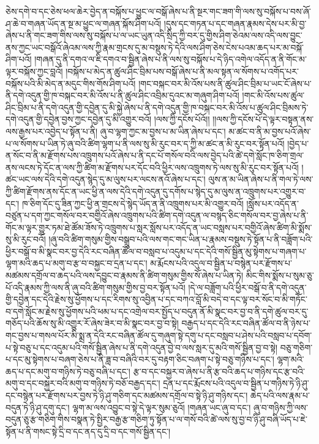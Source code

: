 ཅེས་དགེ་བ་དང་ཅེས་ཕལ་ཆེར་བྱེད་ན་བསྐོས་པ་ཕྱུང་ལ་བསྒོ་ཞེས་པ་ནི་སྔར་གང་ཟག་གི་ལས་སུ་བསྐོས་པ་བས་ཞོ་ཤ་ཆེ་བ་གཞན་ཡོད་ན་སྔ་མ་ཕྱུང་ལ་གཞན་སྐོས་ཤིག་པའོ། །དུས་དང་གཏན་པ་དང་གཞན་རྣམས་དེས་པར་མི་བྱ་ཞེས་པ་ནི་གང་ཟག་གིས་ལས་སུ་བསྐོས་པ་ལ་ཡང་ཡུན་འདི་སྲིད་ཀྱི་བར་དུ་གྱིས་ཤིག་ཅེའམ་ལས་འདི་ལས་བྱུང་ནས་ཀྱང་ཡང་བསྒོའོ་ཞེའམ་ལས་ཀྱི་རྣམ་གྲངས་དུ་མ་བསྡུས་ཏེ་དེའི་ལས་ཤིག་ཅེས་ངེས་པའམ་ཆད་པར་མ་བསྐོ་ཤིག་པའོ། །གཞན་དུ་ནི་དགའ་ལ་ཇི་དགའ་བ་སྦྱིན་ཞེས་པ་ནི་ལས་སུ་བསྐོས་པ་དེ་ཉིད་འགེལ་འདོད་ན་ནི་གོང་མ་ལྟར་བསྐོས་ཀྱང་བླའོ། །བསྐོས་པ་མེད་ན་ཚུལ་ཤིང་བྲིམ་པས་བསྒོ་ཞེས་པ་ནི་མལ་སྟན་ལ་སོགས་པ་འགོད་པར་བསྐོས་པའི་མི་མེད་ན་མདུང་གིས་གོས་ཤིག་པའོ། །གང་བསྐང་བར་མི་འོས་པས་ནི་ཚུལ་ཤིང་བྲིམ་པ་ཡང་ངོ་ཞེས་པ་ནི་དགེ་འདུན་གྱི་ཁ་བསྐང་བར་མི་འོས་པ་ནི་ཚུལ་ཤིང་འབྲིམ་དུའང་མ་གཞུག་ཤིག་པའོ། །གང་མི་འོས་པས་ཚུལ་ཤིང་བྲིམ་པ་ནི་དགེ་འདུན་གྱི་དབྱེན་དུ་མི་སྐྱེ་ཞེས་པ་ནི་དགེ་འདུན་གྱི་ཁ་བསྐང་བར་མི་འོས་པ་ཚུལ་ཤིང་བྲིམས་ཏེ་དགེ་འདུན་གྱི་དབྱེན་བྱས་ཀྱང་དབྱེན་དུ་མི་འགྱུར་བའོ། །ལས་ཀྱི་དངོས་པོའོ།། །།ལས་ཀྱི་དངོས་པོ་དེ་ལྟར་བསྟན་ནས་ལས་རྒྱས་པར་འབྱེད་པ་སྟོན་པ་ནི། ཞུ་བ་ལྷག་ཀྱང་མ་བྱས་པ་མ་ཡིན་ཞེས་པ་དང་། མ་ཚང་བ་ནི་མ་བྱས་པའོ་ཞེས་པ་ལ་སོགས་པ་ཡིན་ཏེ་ཞུ་བའི་ཚིག་ལྷག་པ་ནི་ལས་སུ་མི་རུང་བར་ད་ཀྱི་མ་ཚང་ན་མི་རུང་བར་སྟོན་པའོ། །བྱེད་པ་ན་སོང་བ་ནི་མ་རྫོགས་པས་འཁྲུགས་པའོ་ཞེས་པ་ནི་དང་པོ་གསོལ་བའི་ལས་བྱེད་པའི་ཚེ་དགེ་སློང་ཁ་ཅིག་གྲལ་ནས་ལངས་ཏེ་དོང་ན་ལས་ཀྱི་ཚིག་མ་རྫོགས་པར་དོང་བའི་ཕྱིར་ལས་འཁྲུགས་ཏེ་ལས་སུ་མི་རུང་བར་སྟོན་པའོ། །ཚང་ཡང་ལས་དེའི་དགེ་འདུན་སྙེད་དུ་མ་ལུས་པར་ལངས་ནའོ་ཞེས་པ་དང་། ལུས་ན་མ་ཡིན་ཞེས་པ་ནི་གལ་ཏེ་ལས་ཀྱི་ཚིག་རྫོགས་ནས་དོང་ན་ཡང་ཕྱི་ན་ལས་དེའི་དགེ་འདུན་དུ་དགོས་པ་སྙེད་དུ་མ་ལུས་ན་འཁྲུགས་པར་འགྱུར་བ་དང་། ཁ་ཅིག་དོང་དུ་ཟིན་ཀྱང་ཕྱི་ན་གྲངས་དེ་སྙེད་ཡོད་ན་ནི་འཁྲུགས་པར་མི་འགྱུར་བའོ། །སློས་པར་འདོད་ན་བཙུན་པ་དག་ཀྱང་གསོལ་བར་བགྱིའོ་ཞེས་འཁྲུགས་པའི་ཚིག་དགེ་འདུན་ལ་བསྙད་ཅིང་གསོལ་བར་བྱ་ཞེས་པ་ནི་གོང་མ་ལྟར་གྱུར་ཏམ་ཐེ་ཚོམ་ཟོས་ཏེ་འཁྲུགས་པ་སླར་སློས་པར་འདོད་ན་ཡང་བསླས་པར་བགྱིའོ་ཞེས་ཚིག་མི་སྨོས་སུ་མི་རུང་བའོ། །ཞུ་བའི་ཚིག་གསུམ་གྱིས་བསྒྲུབ་པའི་ལས་གང་གང་ཡིན་པ་རྣམས་བསྡུས་ཏེ་སྟོན་པ་ནི་བཟློག་པའི་ཕྱིར་བསྒོ་བ་མི་སྣང་བར་བྱ་དེའི་རང་བཞིན་ཚོལ་བ་བསླབ་པ་འདུམ་པ་དང་དེའི་གསོ་སྦྱིན་མུ་སྟེགས་པ་གཞག་པ་ལྷག་མའི་ཆད་པ་མགུ་བ་རྩ་བ་བསྐྱང་བ་དྲན་པ་དང་། མ་རྨོངས་པའི་འདུལ་བ་སྦྱིན་པ་བསྙེན་པར་རྫོགས་པ་མཚམས་དགྲོལ་བ་ཆད་པའི་ལས་དབྱུང་བ་རྣམས་ནི་ཚིག་གསུམ་གྱིས་སོ་ཞེས་པ་ཡིན་ཏེ། མིང་གིས་སྨོས་པ་སུམ་ཅུ་པོ་འདི་རྣམས་ཀྱི་ལས་ནི་ཞུ་བའི་ཚིག་གསུམ་གྱིས་བྱ་བར་སྟོན་པའོ། །དེ་ལ་བཟློག་པའི་ཕྱིར་བསྒོ་བ་ནི་དགེ་འདུན་གྱི་དབྱེན་དང་དེའི་རྗེས་སུ་ཕྱོགས་པ་དང་རིགས་སུ་འབྱིན་པ་དང་བཀའ་བློ་མི་བདེ་བ་དང་ལྟ་བར་སོང་བ་མི་གཏོང་བ་དགེ་སློང་མ་རྗེས་སུ་ཕྱོགས་པའི་ཕམ་པ་དང་འགྲེལ་བར་སྤྱོད་པ་བདུན་ནོ་མི་སྣང་བར་བྱ་བ་ནི་དགེ་ཚུལ་བར་དུ་གཅོད་པའི་ཆོས་སུ་མི་འགྱུར་རོ་ཞེས་ཟེར་བ་མི་སྣང་བར་བྱ་བ་སྟེ། བརྒྱད་པ་དང་དེའི་རང་བཞིན་ཚོལ་བ་ནི་ཉེས་པ་གང་བྱས་པ་གསལ་པོར་མི་སྨྲ་ན་དེའི་རང་བཞིན་ཚོལ་དུ་གཞུག་སྟེ་དགུ་པ་དང་བསླབ་པ་ཤེས་པའི་བསླབ་པ་དབོག་པ་སྟེ་བཅུ་པ་དང་འདུམ་པའི་གསོ་སྦྱིན་ཞེས་པ་ནི་དགེ་འདུན་བྱེ་བ་ལས་སླར་དུ་མའི་གསོ་སྦྱིན་བྱ་བ་སྟེ། བཅུ་གཅིག་པ་དང་མུ་སྟེགས་པ་བཞག་ཅེས་པ་ནི་ཟླ་བ་བཞིའི་བར་དུ་བརྟག་ཅིང་བཞག་པ་སྟེ་བཅུ་གཉིས་པ་དང་། ལྷག་མའི་ཆད་པ་དང་མགུ་བ་གཉིས་ཏེ་བཅུ་བཞི་པ་དང་། རྩ་བ་དང་བསྐྱར་བ་ཞེས་པ་ནི་རྩ་བའི་ཆད་པ་གཉིས་དང་རྩ་བའི་མགུ་བ་དང་བསྐྱར་བའི་མགུ་བ་གཉིས་ཏེ་བཅོ་བརྒྱད་དང་། དྲན་པ་དང་རྨོངས་པའི་འདུལ་བ་སྦྱིན་པ་གཉིས་ཏེ་ཉི་ཤུ་དང་བསྙེན་པར་རྫོགས་པར་བྱས་ཏེ་ཉི་ཤུ་གཅིག་དང་མཚམས་དགྲོལ་བ་སྟེ་ཉི་ཤུ་གཉིས་དང་། ཆེད་པའི་ལས་རྣམ་པ་བདུན་ཏེ་ཉི་ཤུ་དགུ་དང་། ལྷག་མ་ལས་འབྱུང་བ་སྟེ་དེ་ལྟར་སུམ་ཅུའོ། །གཞན་ཡང་ཞུ་བ་དང་། ཞུ་བ་གཉིས་ཀྱི་ལས་བདུན་ཅུ་རྩ་གཅིག་གིས་བསྣན་ཏེ་སྤྱིར་བརྒྱ་རྩ་གཅིག་ཏུ་སྟོན་པ་ལ་གསོ་བའི་ཚེ་ལས་སུ་བྱ་བ་ཉི་ཤུ་བཞི་ཡོད་པ་ཇེ་སྟོན་པ་ནི་གསང་སྟེ་དྲི་བ་དང་ནད་དུ་དྲི་བ་དང་གསོ་སྦྱིན་དང་། 